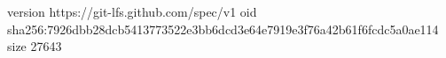version https://git-lfs.github.com/spec/v1
oid sha256:7926dbb28dcb5413773522e3bb6dcd3e64e7919e3f76a42b61f6fcdc5a0ae114
size 27643
